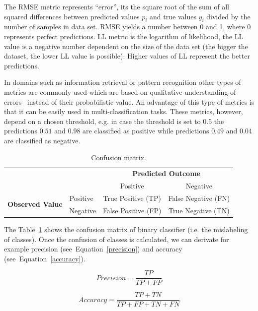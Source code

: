 The RMSE metric represents ``error'', its the square root of the sum of all squared differences between predicted values $p_i$ and true values $y_i$ divided by the number of samples in data set. RMSE yields a number between 0 and 1, where 0 represents perfect predictions. LL metric is the logarithm of likelihood, the LL value is a negative number dependent on the size of the data set (the bigger the dataset, the lower LL value is possible). Higher values of LL represent the better predictions.

In domains such as information retrieval or pattern recognition other types of metrics are commonly used which are based on qualitative understanding of errors~\cite{Pelanek2015a} instead of their probabilistic value. An advantage of this type of metrics is that it can be easily used in multi-classification tasks. These metrics, however, depend on a chosen threshold, e.g. in case the threshold is set to $0.5$ the predictions $0.51$ and $0.98$ are classified as positive while predictions $0.49$ and $0.04$ are classified as negative.

\begin{table}[htbp]
  \centering
  \caption{Confusion matrix.}
  \begin{tabular}{ l l c c }
   \toprule[\heavyrulewidth]
   & & \multicolumn{2}{c}{\textbf{Predicted Outcome}} \\
   & & Positive & Negative \\
   \midrule[\heavyrulewidth]
   \multirow{2}{5em}{\textbf{Observed Value}}
   & Positive & True Positive (TP) & False Negative (FN) \\
   & Negative & False Positive (FP) & True Negative (TN) \\
   \bottomrule[\heavyrulewidth]
  \end{tabular}
  \label{table:confusion-matrix}
\end{table}

The Table~\ref{table:confusion-matrix} shows the confusion matrix of binary classifier (i.e. the mislabeling of classes). Once the confusion of classes is calculated, we can derivate for example precision (see~Equation~\ref{precision}) and accuracy (see~Equation~\ref{accuracy}).

\begin{equation} \label{precision}
  \mathit{Precision} = \frac{TP}{TP + FP}
\end{equation}

\begin{equation} \label{accuracy}
  \mathit{Accuracy} = \frac{TP + TN}{TP + FP + TN + FN}
\end{equation}

